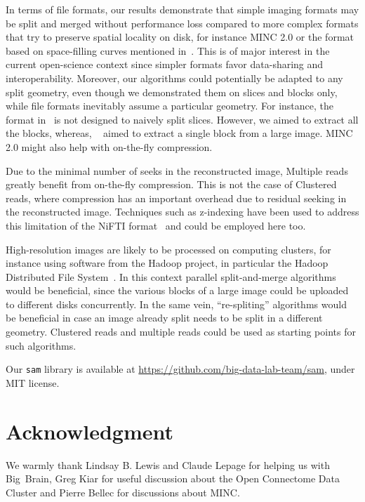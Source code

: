 \documentclass[10pt, conference, compsocconf]{IEEEtran}
\begin{document}
In terms of file formats, our results demonstrate that simple imaging
formats may be split and merged without performance loss compared to
more complex formats that try to preserve spatial locality on disk,
for instance MINC 2.0 or the format based on space-filling curves
mentioned in~\cite{burns2013open}. This is of major interest in the
current open-science context since simpler formats favor data-sharing
and interoperability.  Moreover, our algorithms could potentially be
adapted to any split geometry, even though we demonstrated them on
slices and blocks only, while file formats inevitably assume a
particular geometry. For instance, the format in~\cite{burns2013open}
is not designed to naively split slices. However, we aimed to extract
all the blocks, whereas, ~\cite{burns2013open} aimed to extract a
single block from a large image. MINC 2.0 might also help with
on-the-fly compression.

Due to the minimal number of seeks in the reconstructed image,
Multiple reads greatly benefit from on-the-fly compression. This is
not the case of Clustered reads, where compression has an important
overhead due to residual seeking in the reconstructed
image. Techniques such as z-indexing have been used to address this
limitation of the NiFTI format~\cite{rajna2015speeding} and could be
employed here too.

High-resolution images are likely to be processed on computing
clusters, for instance using software from the Hadoop project, in
particular the Hadoop Distributed File
System~\cite{shvachko2010hadoop}. In this context parallel
split-and-merge algorithms would be beneficial, since the various
blocks of a large image could be uploaded to different disks
concurrently. In the same vein, ``re-spliting'' algorithms would be
beneficial in case an image already split needs to be split in a
different geometry. Clustered reads and multiple reads could be used
as starting points for such algorithms.

Our \texttt{sam} library is available at
\url{https://github.com/big-data-lab-team/sam}, under MIT license.


\section*{Acknowledgment}
We warmly thank Lindsay B. Lewis and Claude Lepage for helping us with
Big~Brain, Greg Kiar for useful discussion about the Open Connectome
Data Cluster and Pierre Bellec for discussions about MINC.



\end{document}
